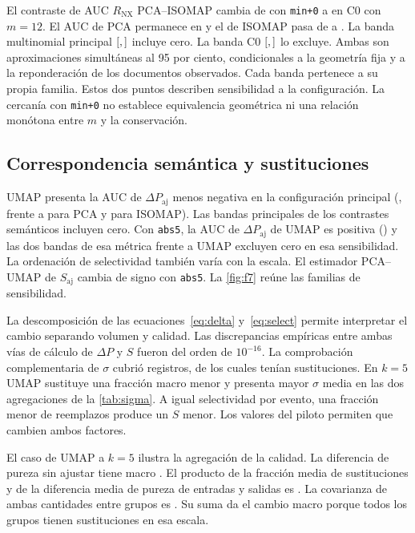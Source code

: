 El contraste de AUC $R_{\mathrm{NX}}$ PCA--ISOMAP cambia de  con \texttt{min+0} a  en C0 con $m=12$. El AUC de PCA permanece en  y el de ISOMAP pasa de  a . La banda multinomial principal $[\Num{bandRNX1inferior},\Num{bandRNX1superior}]$ incluye cero. La banda C0 $[\Num{c0RnxLower},\Num{c0RnxUpper}]$ lo excluye. Ambas son aproximaciones simultáneas al 95 por ciento, condicionales a la geometría fija y a la reponderación de los documentos observados. Cada banda pertenece a su propia familia. Estos dos puntos describen sensibilidad a la configuración. La cercanía con \texttt{min+0} no establece equivalencia geométrica ni una relación monótona entre $m$ y la conservación.

\subsection{Correspondencia semántica y sustituciones}
UMAP presenta la AUC de $\Delta P_{\mathrm{aj}}$ menos negativa en la configuración principal (, frente a  para PCA y  para ISOMAP). Las bandas principales de los contrastes semánticos incluyen cero. Con \texttt{abs5}, la AUC de $\Delta P_{\mathrm{aj}}$ de UMAP es positiva () y las dos bandas de esa métrica frente a UMAP excluyen cero en esa sensibilidad. La ordenación de selectividad también varía con la escala. El estimador PCA--UMAP de $S_{\mathrm{aj}}$ cambia de signo con \texttt{abs5}. La \cref{fig:f7} reúne las familias de sensibilidad.

La descomposición de las ecuaciones~\eqref{eq:delta} y~\eqref{eq:select} permite interpretar el cambio separando volumen y calidad. Las discrepancias empíricas entre ambas vías de cálculo de $\Delta P$ y $S$ fueron del orden de $10^{-16}$. La comprobación complementaria de $\sigma$ cubrió  registros, de los cuales  tenían sustituciones. En $k=5$ UMAP sustituye una fracción macro menor y presenta mayor $\sigma$ media en las dos agregaciones de la \cref{tab:sigma}. A igual selectividad por evento, una fracción menor de reemplazos produce un $S$ menor. Los valores del piloto permiten que cambien ambos factores.

El caso de UMAP a $k=5$ ilustra la agregación de la calidad. La diferencia de pureza sin ajustar tiene macro . El producto de la fracción media de sustituciones y de la diferencia media de pureza de entradas y salidas es . La covarianza de ambas cantidades entre grupos es . Su suma da el cambio macro porque todos los grupos tienen sustituciones en esa escala.

